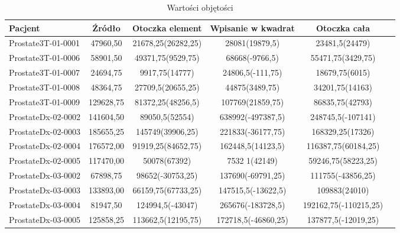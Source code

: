 \documentclass[a4paper,11pt,twoside]{report}
\theoremstyle{definition}
\begin{document}
\begin{table}[h!]
\caption{Wartości objętości}
\centering
\begin{tabular}{|l|c|c|c|c|c|} \hline  
Pacjent             & Źródło	&  Otoczka element	 & Wpisanie w kwadrat	& Otoczka cała          \\ \hline
Prostate3T-01-0001	& 47960,50	& 21678,25(26282,25) & 	28081(19879,5)	    & 23481,5(24479)        \\ \hline
Prostate3T-01-0006	& 58901,50	& 49371,75(9529,75)	 & 68668(-9766,5)	    & 55471,75(3429,75)     \\ \hline
Prostate3T-01-0007	& 24694,75	& 9917,75(14777)	 & 24806,5(-111,75)	    & 18679,75(6015)        \\ \hline
Prostate3T-01-0008	& 48364,75	& 27709,5(20655,25)	 & 44875(3489,75)	    & 34201,75(14163)       \\ \hline
Prostate3T-01-0009	& 129628,75	& 81372,25(48256,5)	 & 107769(21859,75)	    & 86835,75(42793)       \\ \hline
ProstateDx-02-0002	& 141604,50	& 89050,5(52554)	 & 638992(-497387,5)	& 248745,5(-107141)     \\ \hline
ProstateDx-02-0003	& 185655,25	& 145749(39906,25)	 & 221833(-36177,75)	& 168329,25(17326)      \\ \hline
ProstateDx-02-0004	& 176572,00	& 91919,25(84652,75) & 	162448,5(14123,5)	& 116387,75(60184,25)   \\ \hline
ProstateDx-02-0005	& 117470,00	& 50078(67392)	     & 7532 1(42149)	    & 59246,75(58223,25)    \\ \hline
ProstateDx-03-0002	& 67898,75	& 98652(-30753,25)	 & 137690(-69791,25)	& 111755(-43856,25)     \\ \hline
ProstateDx-03-0003	& 133893,00	& 66159,75(67733,25) & 	147515,5(-13622,5)	& 109883(24010)         \\ \hline
ProstateDx-03-0004	& 81947,50	& 124994,5(-43047)	 & 265676(-183728,5)	& 192162,75(-110215,25) \\ \hline
ProstateDx-03-0005	& 125858,25	& 113662,5(12195,75) & 	172718,5(-46860,25)	& 137877,5(-12019,25)   \\ \hline 
\end{tabular}
\label{Objętości pacjenci}
\end{table}
\end{document}
